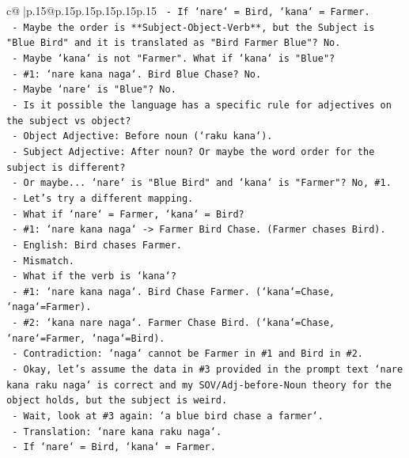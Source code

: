 \documentclass{article}
\begin{document}
{\begin{supertabular}{c@{$\;$}|p{.15\linewidth}@{}p{.15\linewidth}p{.15\linewidth}p{.15\linewidth}p{.15\linewidth}p{.15\linewidth}}
{{{\texttt{      {-} If `nare` = Bird, `kana` = Farmer.} \\
\texttt{      {-} Maybe the order is **Subject{-}Object{-}Verb**, but the Subject is "Blue Bird" and it is translated as "Bird Farmer Blue"? No.} \\
\texttt{      {-} Maybe `kana` is not "Farmer". What if `kana` is "Blue"?} \\
\texttt{        {-} \#1: `nare kana naga`. Bird Blue Chase? No.} \\
\texttt{      {-} Maybe `nare` is "Blue"? No.} \\
\texttt{    {-} Is it possible the language has a specific rule for adjectives on the subject vs object?} \\
\texttt{      {-} Object Adjective: Before noun (`raku kana`).} \\
\texttt{      {-} Subject Adjective: After noun? Or maybe the word order for the subject is different?} \\
\texttt{      {-} Or maybe... `nare` is "Blue Bird" and `kana` is "Farmer"? No, \#1.} \\
\texttt{    {-} Let's try a different mapping.} \\
\texttt{      {-} What if `nare` = Farmer, `kana` = Bird?} \\
\texttt{        {-} \#1: `nare kana naga` {-}> Farmer Bird Chase. (Farmer chases Bird).} \\
\texttt{          {-} English: Bird chases Farmer.} \\
\texttt{          {-} Mismatch.} \\
\texttt{      {-} What if the verb is `kana`?} \\
\texttt{        {-} \#1: `nare kana naga`. Bird Chase Farmer. (`kana`=Chase, `naga`=Farmer).} \\
\texttt{        {-} \#2: `kana nare naga`. Farmer Chase Bird. (`kana`=Chase, `nare`=Farmer, `naga`=Bird).} \\
\texttt{          {-} Contradiction: `naga` cannot be Farmer in \#1 and Bird in \#2.} \\
\texttt{    {-} Okay, let's assume the data in \#3 provided in the prompt text `nare kana raku naga` is correct and my SOV/Adj{-}before{-}Noun theory for the object holds, but the subject is weird.} \\
\texttt{    {-} Wait, look at \#3 again: `a blue bird chase a farmer`.} \\
\texttt{    {-} Translation: `nare kana raku naga`.} \\
\texttt{    {-} If `nare` = Bird, `kana` = Farmer.} \\
}}}
\end{supertabular}}
\end{document}
